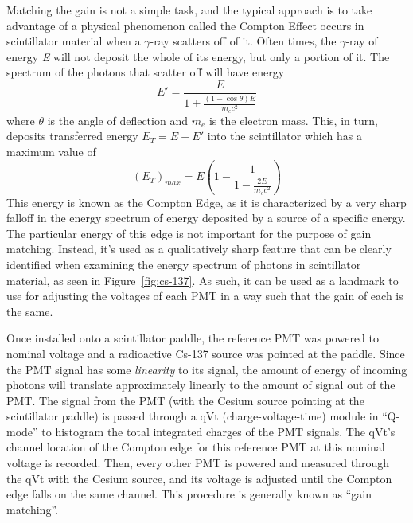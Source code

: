 Matching the gain is not a simple task, and the typical approach is to take advantage of a physical phenomenon called the Compton Effect occurs in scintillator material when a $\gamma$-ray scatters off of it. Often times, the $\gamma$-ray of energy \emph{E} will not deposit the whole of its energy, but only a portion of it. The spectrum of the photons that scatter off will have energy
\begin{equation}
E' = \frac{E}{1 + \frac{(1-\cos \theta) E}{m_e c^2}}
\end{equation}
where $\theta$ is the angle of deflection and $m_e$ is the electron mass. This, in turn, deposits transferred energy $E_T = E - E'$ into the scintillator which has a maximum value of
\begin{equation}
(E_T)_{max} = E \left( 1 - \frac{1}{1-\frac{2 E}{m_e c^2}} \right)
\end{equation}
This energy is known as the Compton Edge, as it is characterized by a very sharp falloff in the energy spectrum of energy deposited by a source of a specific energy. The particular energy of this edge is not important for the purpose of gain matching. Instead, it's used as a qualitatively sharp feature that can be clearly identified when examining the energy spectrum of photons in scintillator material, as seen in Figure~\ref{fig:cs-137}. As such, it can be used as a landmark to use for adjusting the voltages of each PMT in a way such that the gain of each is the same.

Once installed onto a scintillator paddle, the reference PMT was powered to nominal voltage and a radioactive Cs-137 source was pointed at the paddle. Since the PMT signal has some \emph{linearity} to its signal, the amount of energy of incoming photons will translate approximately linearly to the amount of signal out of the PMT. The signal from the PMT (with the Cesium source pointing at the scintillator paddle) is passed through a qVt (charge-voltage-time) module in ``Q-mode'' to histogram the total integrated charges of the PMT signals. The qVt's channel location of the Compton edge for this reference PMT at this nominal voltage is recorded. Then, every other PMT is powered and measured through the qVt with the Cesium source, and its voltage is adjusted until the Compton edge falls on the same channel. This procedure is generally known as ``gain matching''.

